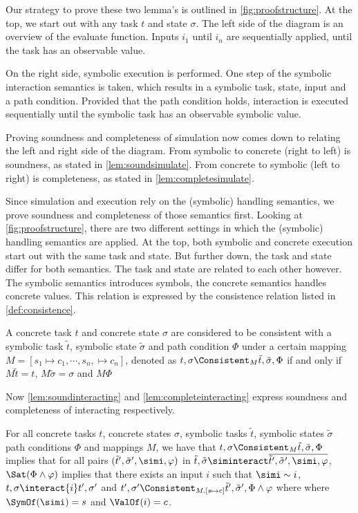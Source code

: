 Our strategy to prove these two lemma's is outlined in \cref{fig:proofstructure}.
At the top, we start out with any task $t$ and state $\sigma$.
The left side of the diagram is an overview of the evaluate function.
Inputs $i_1$ until $i_n$ are sequentially applied, until the task has an observable value.

On the right side, symbolic execution is performed.
One step of the symbolic interaction semantics is taken, which results in a symbolic task, state, input and a path condition.
Provided that the path condition holds, interaction is executed sequentially until the symbolic task has an observable symbolic value.

Proving soundness and completeness of simulation now comes down to relating the left and right side of the diagram.
From symbolic to concrete (right to left) is soundness, as stated in \cref{lem:soundsimulate}.
From concrete to symbolic (left to right) is completeness, as stated in \cref{lem:completesimulate}.

Since simulation and execution rely on the (symbolic) handling semantics,
we prove soundness and completeness of those semantics first.
Looking at \cref{fig:proofstructure}, there are two different settings in which the (symbolic) handling semantics are applied.
At the top, both symbolic and concrete execution start out with the same task and state.
But further down, the task and state differ for both semantics.
The task and state are related to each other however.
The symbolic semantics introduces symbols, the concrete semantics handles concrete values.
This relation is expressed by the consistence relation listed in \cref{def:consistence}.

\begin{definition}
  \label{def:consistence}
  A concrete task $t$ and concrete state $\sigma$
  are considered to be consistent with a symbolic task $\tilde{t}$, symbolic state $\tilde{\sigma}$ and path condition $\Phi$
  under a certain mapping $M=[s_1\mapsto c_1,\cdots,s_n,\mapsto c_n]$, denoted as $t,\sigma \Consistent_M \tilde{t},\tilde{\sigma},\Phi$
  if and only if $M\tilde{t}=t$, $M\tilde{\sigma}=\sigma$ and $M\Phi$
\end{definition}

Now \cref{lem:soundinteracting} and \cref{lem:completeinteracting} express soundness and completeness of interacting respectively.

\begin{lemma}
  \label{lem:soundinteracting}
  For all concrete tasks $t$, concrete states $\sigma$, symbolic tasks $\tilde{t}$, symbolic states $\tilde{\sigma}$ path conditions $\Phi$ and mappings $M$,
  we have that $t,\sigma\Consistent_M\tilde{t},\tilde{\sigma},\Phi$ implies
  that for all pairs $(\tilde{t}',\tilde{\sigma}',\simi,\phi)$ in $\tilde{t},\tilde{\sigma}\siminteract\overline{\tilde{t}',\tilde{\sigma}',\simi,\phi}$,
  $\Sat(\Phi\land\phi)$ implies that there exists an input $i$ such that $\simi\sim i$,  $t,\sigma\interact{i}t',\sigma'$ and $t',\sigma' \Consistent_{M.[s\mapsto c]} \tilde{t}',\tilde{\sigma}',\Phi\land\phi$ where where $\SymOf(\simi)=s$ and $\ValOf(i)=c$.
\end{lemma}

